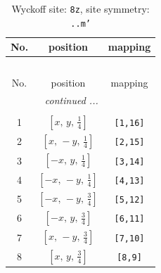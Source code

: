 \documentclass[fleqn,8pt]{jsarticle}
\begin{document}
\begin{longtable}{ccc}
\caption{Wyckoff site: {\tt 8z}, site symmetry: {\tt ..m'}}
 \\
 \hline \hline
No. & position & mapping \\ \hline \endfirsthead

\multicolumn{2}{l}{\tablename\ \thetable{}} \\
 \hline \hline
No. & position & mapping \\ \hline \endhead

 \hline \hline
\multicolumn{2}{r}{\footnotesize\it continued ...} \\ \endfoot

 \hline \hline
\multicolumn{2}{r}{} \\ \endlastfoot

1 & $\left[ x,\, y,\, \frac{1}{4} \right]$ & {\tt [1,16]} \\ \hline
2 & $\left[ x,\, - y,\, \frac{1}{4} \right]$ & {\tt [2,15]} \\ \hline
3 & $\left[ - x,\, y,\, \frac{1}{4} \right]$ & {\tt [3,14]} \\ \hline
4 & $\left[ - x,\, - y,\, \frac{1}{4} \right]$ & {\tt [4,13]} \\ \hline
5 & $\left[ - x,\, - y,\, \frac{3}{4} \right]$ & {\tt [5,12]} \\ \hline
6 & $\left[ - x,\, y,\, \frac{3}{4} \right]$ & {\tt [6,11]} \\ \hline
7 & $\left[ x,\, - y,\, \frac{3}{4} \right]$ & {\tt [7,10]} \\ \hline
8 & $\left[ x,\, y,\, \frac{3}{4} \right]$ & {\tt [8,9]} \\
\end{longtable}
\renewcommand{\arraystretch}{1.2}
\end{document}
